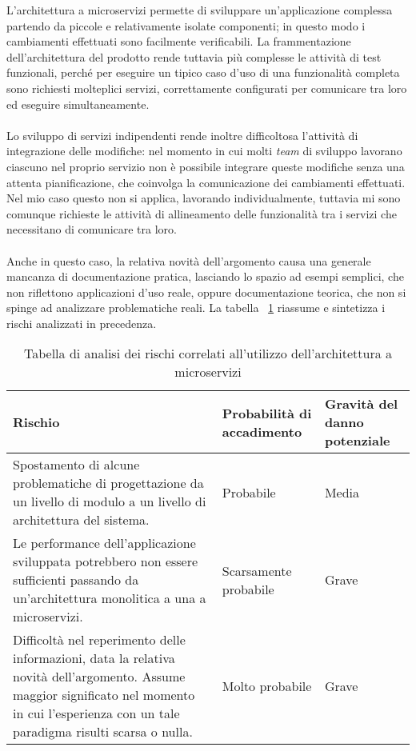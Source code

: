 L'architettura a microservizi permette di sviluppare un'applicazione complessa partendo da piccole e relativamente isolate componenti;
in questo modo i cambiamenti effettuati sono facilmente verificabili.
La frammentazione dell'architettura del prodotto rende tuttavia più complesse le attività di test funzionali, perché per eseguire un tipico caso d'uso di una funzionalità completa sono richiesti molteplici servizi, correttamente configurati per comunicare tra loro ed eseguire simultaneamente. \\ \\
Lo sviluppo di servizi indipendenti rende inoltre difficoltosa l'attività di integrazione delle modifiche: nel momento in cui molti \emph{team} di sviluppo lavorano ciascuno nel proprio servizio non è possibile integrare queste modifiche senza una attenta pianificazione, che coinvolga la comunicazione dei cambiamenti effettuati. \\
Nel mio caso questo non si applica, lavorando individualmente, tuttavia mi sono comunque richieste le attività di allineamento delle funzionalità tra i servizi che necessitano di comunicare tra loro. \\ \\
Anche in questo caso, la relativa novità dell'argomento causa una generale mancanza di documentazione pratica, lasciando lo spazio ad esempi semplici, che non riflettono applicazioni d'uso reale, oppure documentazione teorica, che non si spinge ad analizzare problematiche reali.
La tabella ~\ref{tab:rischi-arch-microservizi} riassume e sintetizza i rischi analizzati in precedenza.

\begin{table}[H]
\caption{Tabella di analisi dei rischi correlati all'utilizzo dell'architettura a microservizi}
\label{tab:rischi-arch-microservizi}
\begin{tabularx}{\linewidth}{|p{7.5cm}|X|X|}
\hline
\textbf{Rischio} & \textbf{Probabilità di accadimento} & \textbf{Gravità del danno potenziale}\\
\hline
Spostamento di alcune problematiche di progettazione da un livello di modulo a un livello di architettura del sistema. & Probabile & Media \\
\hline
Le performance dell'applicazione sviluppata potrebbero non essere sufficienti passando da un'architettura monolitica a una a microservizi. & Scarsamente probabile & Grave \\
\hline
Difficoltà nel reperimento delle informazioni, data la relativa novità dell'argomento. Assume maggior significato nel momento in cui l'esperienza con un tale paradigma risulti scarsa o nulla. & Molto probabile & Grave \\
\hline
\end{tabularx}
\end{table}

